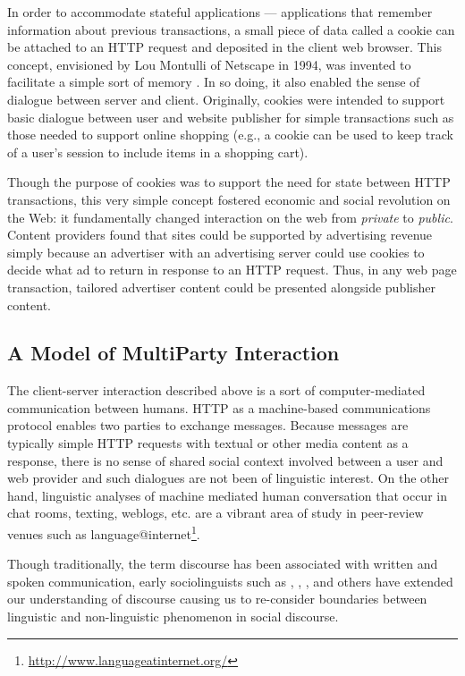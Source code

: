 In order to accommodate stateful applications --- applications that remember information about previous transactions, a small piece of data called a cookie can be attached to an HTTP request and deposited in the client web browser. This concept, envisioned by Lou Montulli of Netscape in 1994, was invented to facilitate a simple sort of memory  \citep{Schwartz:2001uk}.  In so doing, it also enabled the sense of dialogue between server and client. Originally, cookies were intended to support basic dialogue between user and website publisher for simple transactions such as those needed to support online shopping (e.g., a cookie can be used to keep track of a user's session to include items in a shopping cart).

Though the purpose of cookies was to support the need for state between HTTP transactions, this very simple concept fostered economic and social revolution on the Web: it fundamentally changed interaction on the web from \emph{private} to \emph{public}. Content providers found that sites could be supported by advertising revenue simply because an advertiser with an advertising server could use cookies to decide what ad to return in response to an HTTP request. Thus, in any web page transaction, tailored advertiser content could be presented alongside publisher content.

\subsection{A Model of MultiParty Interaction}
\label{amodelofmultipartyinteraction}


\begin{sloppier}
The client-server interaction described above is a sort of computer-mediated communication between humans. HTTP as a machine-based communications protocol enables two parties to exchange messages. Because messages are typically simple HTTP requests with textual or other media content as a response, there is no sense of shared social context involved between a user and web provider and such dialogues are not been of linguistic interest. On the other hand, linguistic analyses of machine mediated human conversation that occur in chat rooms, texting, weblogs, etc. are a vibrant area of study in peer-review venues such as language@internet\footnote{\url{http://www.languageatinternet.org/}}.
\end{sloppier}


Though traditionally, the term discourse has been associated with written and spoken communication, early sociolinguists such as  \cite{Hymes:1974wr}, \cite{Gumperz:1982tc}, \cite{Goffman:1981tm}, \cite{Garfinkel:1967vn}  and others have extended our understanding of discourse causing us to re-consider boundaries between linguistic and non-linguistic phenomenon in social discourse. 

